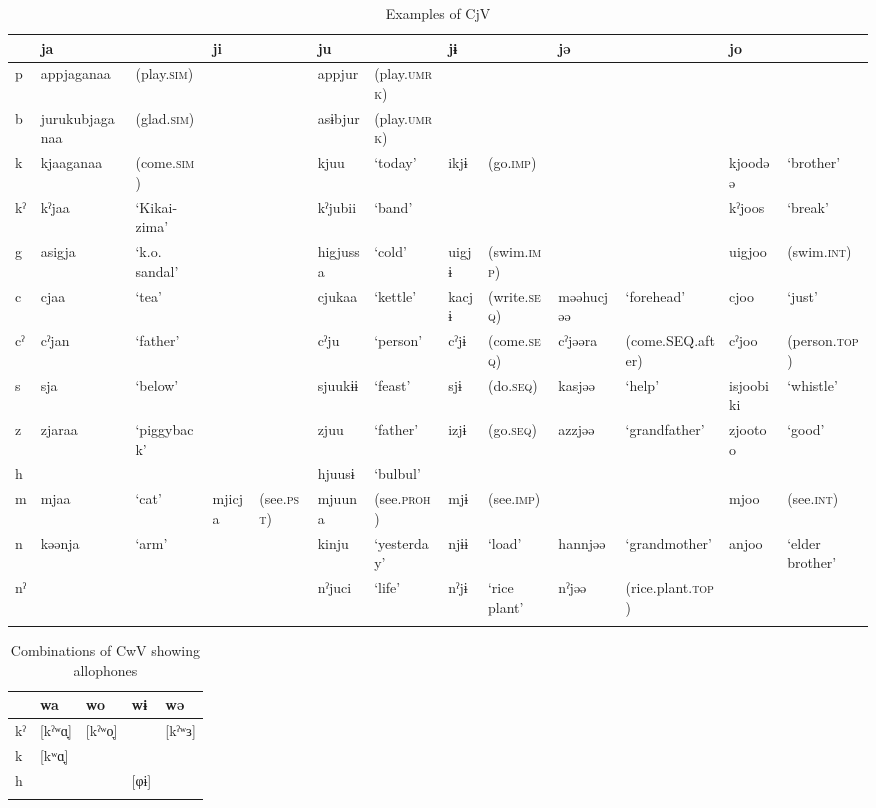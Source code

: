 \begin{sidewaystable}
\caption{Examples of CjV}
\footnotesize
\begin{tabular}{@{}l @{\hspace{.5em}}  *{5}{l@{ }l@{\hspace{.5em}}} l@{ } l@{}} 
\lsptoprule
 & ja &  & ji &  & ju &  & jɨ &  & jə &  & jo & \\\midrule
p & appjaganaa & (play.\textsc{sim}) &  &  & appjur & (play.\textsc{umrk}) &  &  &  &  &  & \\
b & jurukubjaganaa & (glad.\textsc{sim}) & & &  asɨbjur & (play.\textsc{umrk}) &  &  &  &  &  & \\
k & kjaaganaa & (come.\textsc{sim}) &  &  & kjuu & ‘today’ & ikjɨ & (go.\textsc{imp}) &  &  & kjoodəə & ‘brother’\\
kˀ & kˀjaa & ‘Kikai-zima’ &  &  & kˀjubii & ‘band’ &  &  &  &  & kˀjoos & ‘break’\\
g & asigja & ‘k.o. sandal’ &  &  & higjussa & ‘cold’ & uigjɨ & (swim.\textsc{imp}) &  &  & uigjoo & (swim.\textsc{int})\\
c & cjaa & ‘tea’ &  &  & cjukaa & ‘kettle’ & kacjɨ & (write.\textsc{seq}) & məəhucjəə & ‘forehead’ & cjoo & ‘just’\\
cˀ & cˀjan & ‘father’ &  &  & cˀju & ‘person’ & cˀjɨ & (come.\textsc{seq}) & cˀjəəra & (come.SEQ.after) & cˀjoo & (person.\textsc{top})\\
s & sja & ‘below’ &  &  & sjuukɨɨ & ‘feast’ & sjɨ & (do.\textsc{seq}) & kasjəə & ‘help’ & isjoobiki & ‘whistle’\\
z & zjaraa & ‘piggyback’ &  &  & zjuu & ‘father’ & izjɨ & (go.\textsc{seq}) & azzjəə & ‘grandfather’ & zjootoo & ‘good’\\
h &  &  &  &  & hjuusɨ & ‘bulbul’ &  &  &  &  &  & \\
m & mjaa & ‘cat’ & mjicja & (see.\textsc{pst})  & mjuuna & (see.\textsc{proh}) & mjɨ & (see.\textsc{imp}) &  &  & mjoo & (see.\textsc{int})\\
n & kəənja & ‘arm’ &  &  & kinju & ‘yesterday’ & njɨɨ & ‘load’ & hannjəə & ‘grandmother’ & anjoo & ‘elder brother’\\
nˀ &  &  &  &  & nˀjuci & ‘life’ & nˀjɨ & ‘rice plant’ & nˀjəə & (rice.plant.\textsc{top}) &  & \\
\lspbottomrule
\end{tabular}
\end{sidewaystable}


\begin{table}
\caption{Combinations of CwV showing allophones\label{bkm:Ref365009143}}
\begin{tabularx}{\textwidth}{lQQQQ}
\lsptoprule
   & wa &  wo &  wɨ & wə\\\midrule
kˀ &  [kˀʷɑ̟] & [kˀʷo̞]   & & [kˀʷɜ]\\
k  &  [kʷɑ̟]      \\
h  &          &      & [φɨ]  \\
\lspbottomrule
\end{tabularx}
\end{table}


